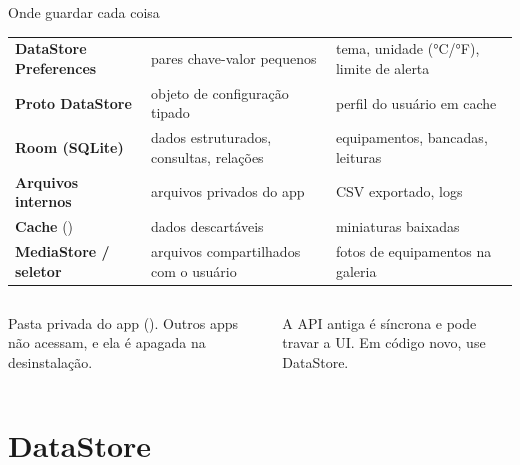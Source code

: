 \documentclass[aspectratio=169,10pt]{beamer}
\begin{document}
\begin{frame}{Onde guardar cada coisa}
  \footnotesize
  \begin{tabularx}{\textwidth}{@{}l L L@{}}
    \toprule
     &  &  \\
    \midrule
    \textbf{DataStore Preferences} & pares chave-valor pequenos & tema, unidade (°C/°F), limite de alerta \\
    \textbf{Proto DataStore} & objeto de configuração tipado & perfil do usuário em cache \\
    \textbf{Room (SQLite)} & dados estruturados, consultas, relações & equipamentos, bancadas, leituras \\
    \textbf{Arquivos internos} & arquivos privados do app & CSV exportado, logs \\
    \textbf{Cache} () & dados descartáveis & miniaturas baixadas \\
    \textbf{MediaStore / seletor} & arquivos compartilhados com o usuário & fotos de equipamentos na galeria \\
    \bottomrule
  \end{tabularx}
  \vspace{4pt}
  \begin{columns}[T]
    \begin{column}{0.48\textwidth}
      \begin{conceito}
        Pasta privada do app (). Outros apps não acessam, e ela é apagada na desinstalação.
      \end{conceito}
    \end{column}
    \begin{column}{0.48\textwidth}
      \begin{atencao}[SharedPreferences]
        A API antiga é síncrona e pode travar a UI. Em código novo, use DataStore.
      \end{atencao}
    \end{column}
  \end{columns}
\end{frame}

\section{DataStore}
\end{document}
